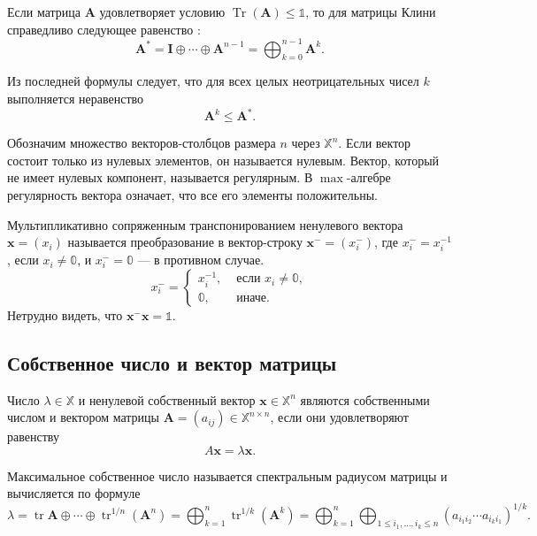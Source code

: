 \documentclass[specialist,
               substylefile = spbu.rtx,
               subf,href,colorlinks=true, 12pt]{disser}
\DeclareMathOperator{\tr}{tr}
\DeclareMathOperator{\Tr}{Tr}
\theoremstyle{definition}
\begin{document}
Если матрица $\bm{A}$ удовлетворяет условию $\Tr(\bm{A})\leq\mathbb{1}$, то для матрицы Клини справедливо следующее равенство \cite{Carre1971Algebra, Litvinov2001Idempotent}: 
\begin{equation*}
\bm{A}^{\ast}=\bm{I}\oplus\cdots\oplus\bm{A}^{n-1}=\bigoplus_{k=0}^{n-1}\bm{A}^{k}.
\end{equation*}

Из последней формулы следует, что для всех целых неотрицательных чисел $k$ выполняется неравенство
\begin{equation}\label{eq:Carre}
\bm{A}^{k}\leq\bm{A}^{\ast}.
\end{equation}

Обозначим множество векторов-столбцов размера $n$ через $\mathbb{X}^{n}$.
Если вектор состоит только из нулевых элементов, он называется нулевым.
Вектор, который не имеет нулевых компонент, называется регулярным. В $\max$-алгебре регулярность вектора означает, что все его элементы положительны.

Мультипликативно сопряженным транспонированием ненулевого вектора $\bm{x}=(x_{i})$ называется преобразование в вектор-строку $\bm{x}^{-}=(x_{i}^{-})$, где $x_{i}^{-}=x_{i}^{-1}$, если $x_{i}\neq\mathbb{0}$, и $x_{i}^{-}=\mathbb{0}$ --- в противном случае. 
\begin{equation*}
x_{i}^{-}=
\begin{cases}
x_{i}^{-1}, &\text{ если } x_{i}\neq\mathbb{0},
\\
\mathbb{0}, &\text{ иначе}.
\end{cases}
\end{equation*}
Нетрудно видеть, что $\bm{x}^{-}\bm{x}=\mathbb{1}$.


\subsection{Собственное число и вектор матрицы}
Число $\lambda\in\mathbb{X}$ и ненулевой собственный вектор $\bm{x}\in\mathbb{X}^{n}$ являются собственными числом и вектором матрицы $\bm{A}=(a_{ij})\in\mathbb{X}^{n\times n}$, если они удовлетворяют равенству
\begin{equation*}
{A}\bm{x}=\lambda\bm{x}.
\end{equation*}

Максимальное собственное число называется спектральным радиусом матрицы и вычисляется по формуле 
\begin{equation}\label{eq:lambda}
\lambda=\tr\bm{A}\oplus\cdots\oplus\tr^{1/n}(\bm{A}^{n})
=
\bigoplus_{k=1}^{n}\tr^{1/k}(\bm{A}^{k})
=
\bigoplus_{k=1}^{n}
\bigoplus_{
1\leq i_{1},\ldots,i_{k}\leq n}
(a_{i_{1}i_{2}}\cdots a_{i_{k}i_{1}})^{1/k}
.
\end{equation}
\end{document}
